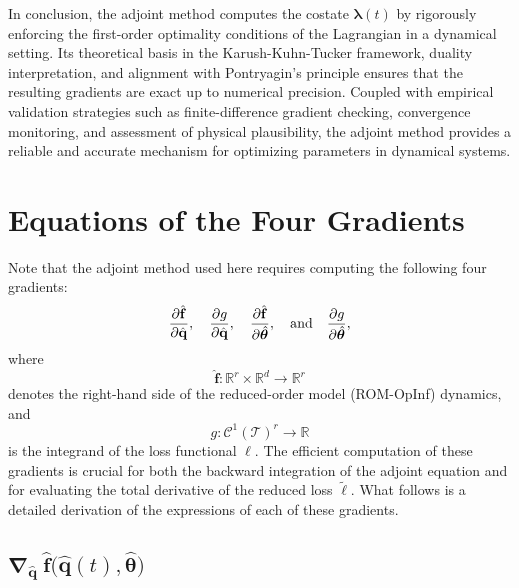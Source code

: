 In conclusion, the adjoint method computes the costate $\bm{\lambda}(t)$ by rigorously enforcing the first-order optimality conditions of the Lagrangian in a dynamical setting. Its theoretical basis in the Karush-Kuhn-Tucker framework, duality interpretation, and alignment with Pontryagin's principle ensures that the resulting gradients are exact up to numerical precision. Coupled with empirical validation strategies such as finite-difference gradient checking, convergence monitoring, and assessment of physical plausibility, the adjoint method provides a reliable and accurate mechanism for optimizing parameters in dynamical systems.


\section{Equations of the Four Gradients}
\label{sec:four_gradients}

Note that the adjoint method used here requires computing the following four gradients:\\
$$\pdv{\hat{\mathbf{f}}}{\hat{\mathbf{q}}},  \quad \pdv{g}{\hat{\mathbf{q}}}, \quad \pdv{\hat{\mathbf{f}}}{\hat{\bm{\theta}}},\quad \text{and} \quad \pdv{g}{\hat{\bm{\theta}}},$$
where\\
$$\hat{\mathbf{f}}:\mathbb{R}^r \times \mathbb{R}^d \to \mathbb{R}^r$$ 
denotes the right-hand side of the reduced-order model (ROM-OpInf) dynamics, and\\
$$g:\mathcal{C}^1(\mathcal{T})^r\to \mathbb{R}$$ 
is the integrand of the loss functional $\ell$. The efficient computation of these gradients is crucial for both the backward integration of the adjoint equation and for evaluating the total derivative of the reduced loss $\tilde\ell$. What follows is a detailed derivation of the expressions of each of these gradients.

\subsection{$\bm{\nabla}_{\hat{\mathbf{q}}}~\hat{\mathbf{f}}\bigl(\hat{\mathbf{q}}(t), \hat{\bm{\theta}}\bigr)$}

